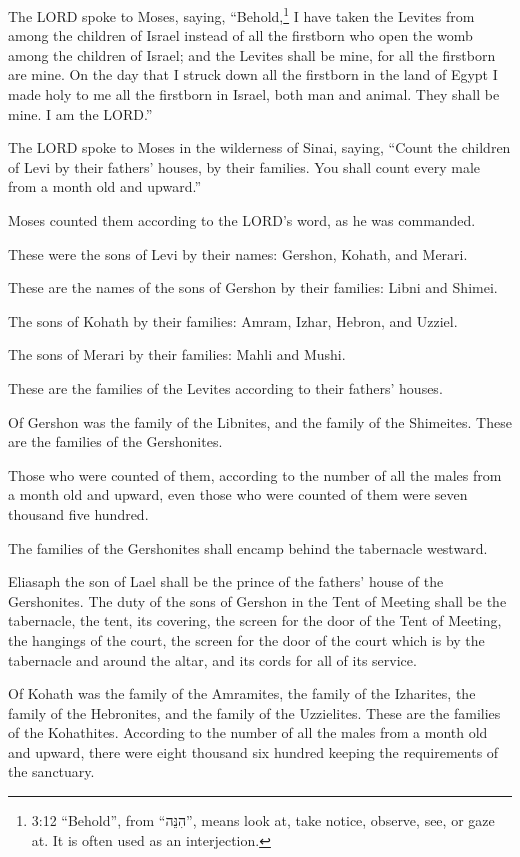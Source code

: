 \myverse{}The LORD spoke to Moses, saying,
\myverse{}“Behold,\footnote{ 3:12 “Behold”, from “הִנֵּה”, means look at, take notice, observe, see, or gaze at. It is
	often used as an interjection.} I have taken the Levites from among the children of Israel instead
of all the firstborn who open the womb among the children of Israel; and the Levites shall be mine,
\myverse{}for all the firstborn are mine. On the day that I struck down all the firstborn
in the land of Egypt I made holy to me all the firstborn in Israel, both man and animal. They shall be
mine. I am the LORD.”


\myverse{}The LORD spoke to Moses in the wilderness of Sinai, saying,
\myverse{}“Count the children of Levi by their fathers’ houses, by their families. You
shall count every male from a month old and upward.”


\myverse{}Moses counted them according to the LORD’s word, as he was commanded.


\myverse{}These were the sons of Levi by their names: Gershon, Kohath,
and Merari.


\myverse{}These are the names of the sons of Gershon by their families:
Libni and Shimei.


\myverse{}The sons of Kohath by their families: Amram, Izhar, Hebron, and
Uzziel.


\myverse{}The sons of Merari by their families: Mahli and Mushi.

These are the families of the Levites according to their fathers’ houses.


\myverse{}Of Gershon was the family of the Libnites, and the family of
the Shimeites. These are the families of the Gershonites.


\myverse{}Those who were counted of them, according to the number of all
the males from a month old and upward, even those who were counted of them were seven thousand five hundred.


\myverse{}The families of the Gershonites shall encamp behind the tabernacle
westward.


\myverse{}Eliasaph the son of Lael shall be the prince of the fathers’
house of the Gershonites.
\myverse{}The duty of the sons of Gershon in the Tent of Meeting shall be the tabernacle,
the tent, its covering, the screen for the door of the Tent of Meeting,
\myverse{}the hangings of the court, the screen for the door of the court which is by
the tabernacle and around the altar, and its cords for all of its service.


\myverse{}Of Kohath was the family of the Amramites, the family of the
Izharites, the family of the Hebronites, and the family of the Uzzielites. These are the families of the
Kohathites.
\myverse{}According to the number of all the males from a month old and upward, there
were eight thousand six hundred keeping the requirements of the sanctuary.


